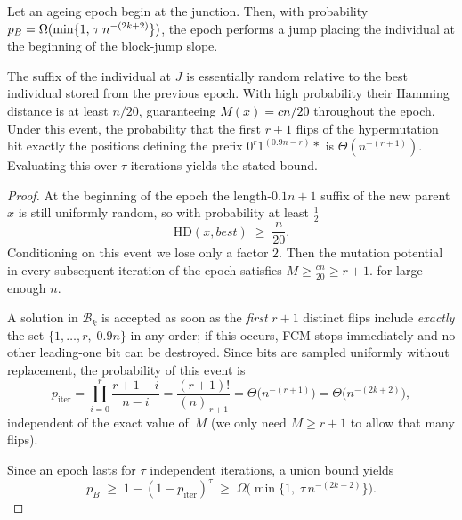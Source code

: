 \begin{lemma} \label{lem:BJO-epoch}
	Let an ageing epoch begin at the junction.
	Then, with probability $\textcolor{black}{p_B}=\Omega(\min\{1,\,\tau\,n^{-(2k+2)}\})$, the epoch performs a jump placing the individual at the beginning of the block-jump slope.
\end{lemma}

The suffix of the individual at $J$ is essentially random relative to the best individual stored from the 
previous epoch. 
With high probability their Hamming distance is at least $n/20$, guaranteeing 
\textcolor{black}{$M(x)= cn/20$} throughout the epoch.  
Under this event, the probability that the first $r+1$ flips of the hypermutation hit exactly the positions defining the prefix $0^{r}1^{(0.9n-r)} *$ is $\Theta(n^{-(r+1)})$.
Evaluating this over $\tau$ iterations yields the stated bound.


\begin{proof}
	At the beginning of the epoch %
	the length-\(0.1n+1\) suffix of the new parent \(x\) is still uniformly random,
	so with probability at least \(\tfrac12\)
	\[
	\mathrm{HD}(x,best)\;\ge\;\frac{n}{20}.
	\]
	Conditioning on this event we lose only a factor \(2\).
	Then the mutation potential in every subsequent
	iteration of the epoch satisfies
	\(
	M\ge \tfrac{cn}{20}  \geq r+1.
	\) for large enough $n$.
	
	A solution in $\mathcal{B}_k$ is accepted as soon as the \emph{first} $r{+}1$ distinct flips
	include \emph{exactly} the set
	\(\{1,\dots,r,\;0.9n\}\)
	in any order; if this occurs, FCM stops immediately and no other
	leading-one bit can be destroyed.
	Since bits are sampled uniformly without replacement, the probability of
	this event is
	\[
	p_{\text{iter}}
	=\prod_{i=0}^{r}\frac{r+1-i}{n-i}
	=\frac{(r+1)!}{(n)_{\,r+1}}
	=\Theta\!\bigl(n^{-(r+1)}\bigr)
	=\Theta\!\bigl(n^{-(2k+2)}\bigr),
	\]
	independent of the exact value of~$M$ (we only need $M\ge r{+}1$ to allow that
	many flips).
	
	Since an epoch lasts for \(\tau\) independent iterations, a union bound yields
	\[
	p_B
	\;\ge\;
	1-(1-p_{\text{iter}})^{\tau}
	\;\ge\;
	\Omega\!\bigl(\min\{1,\;\tau\,n^{-(2k+2)}\}\bigr).
	\]
	
	\noindent
\end{proof}



